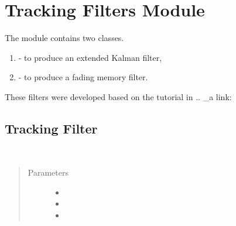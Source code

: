 \documentclass[letterpaper,10pt,english]{Reference manual}
\begin{document}
\chapter{Tracking Filters Module}
\label{\detokenize{trackingfilters::doc}}\label{\detokenize{trackingfilters:tracking-filters-module}}
The module contains two classes.
\begin{enumerate}
\item {} 
 - to produce an extended Kalman filter,

\item {} 
 - to produce a fading memory filter.

\end{enumerate}

These filters were developed based on the tutorial in
.. \_a link: 
\label{\detokenize{trackingfilters:module-tracking_filters}}

\section{Tracking Filter}
\label{\detokenize{trackingfilters:tracking-filter}}

\begin{fulllineitems}
\label{\detokenize{trackingfilters:tracking_filters.TrackingFilter}}~\begin{quote}\begin{description}
\item[{Parameters}] \leavevmode\begin{itemize}
\item {} 
 \textendash{} 

\item {} 
 \textendash{} 

\item {} 
 \textendash{} 

\end{itemize}

\end{description}\end{quote}

\end{fulllineitems}
\end{document}
